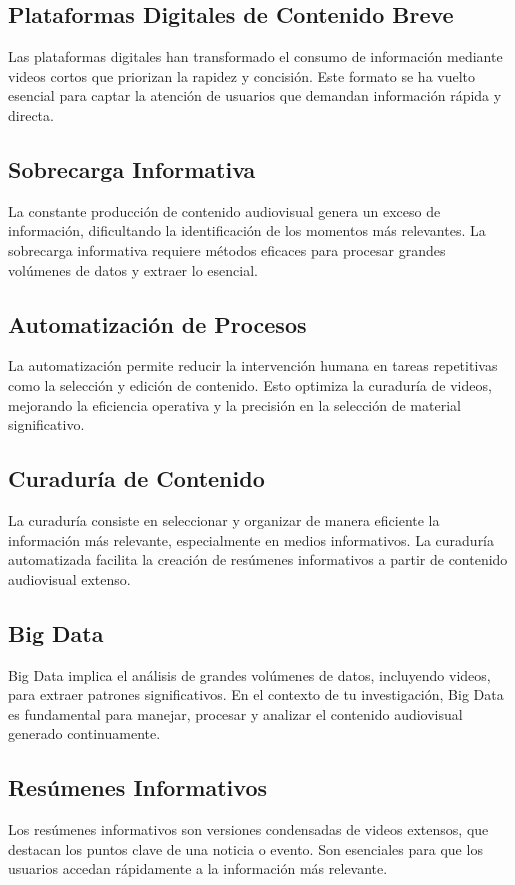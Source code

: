 \subsection{Plataformas Digitales de Contenido Breve}
Las plataformas digitales han transformado el consumo de información mediante videos cortos que priorizan la rapidez y concisión. Este formato se ha vuelto esencial para captar la atención de usuarios que demandan información rápida y directa.

\subsection{Sobrecarga Informativa}
La constante producción de contenido audiovisual genera un exceso de información, dificultando la identificación de los momentos más relevantes. La sobrecarga informativa requiere métodos eficaces para procesar grandes volúmenes de datos y extraer lo esencial.

\subsection{Automatización de Procesos}
La automatización permite reducir la intervención humana en tareas repetitivas como la selección y edición de contenido. Esto optimiza la curaduría de videos, mejorando la eficiencia operativa y la precisión en la selección de material significativo.

\subsection{Curaduría de Contenido}
La curaduría consiste en seleccionar y organizar de manera eficiente la información más relevante, especialmente en medios informativos. La curaduría automatizada facilita la creación de resúmenes informativos a partir de contenido audiovisual extenso.

\subsection{Big Data}
Big Data implica el análisis de grandes volúmenes de datos, incluyendo videos, para extraer patrones significativos. En el contexto de tu investigación, Big Data es fundamental para manejar, procesar y analizar el contenido audiovisual generado continuamente.

\subsection{Resúmenes Informativos}
Los resúmenes informativos son versiones condensadas de videos extensos, que destacan los puntos clave de una noticia o evento. Son esenciales para que los usuarios accedan rápidamente a la información más relevante.

